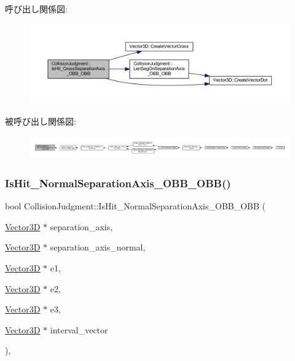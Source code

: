 呼び出し関係図\+:\nopagebreak
\begin{figure}[H]
\begin{center}
\leavevmode
\includegraphics[width=350pt]{class_collision_judgment_a86d5dd5817ff244d22c9efa3eeecbcb7_cgraph}
\end{center}
\end{figure}
被呼び出し関係図\+:
\nopagebreak
\begin{figure}[H]
\begin{center}
\leavevmode
\includegraphics[width=350pt]{class_collision_judgment_a86d5dd5817ff244d22c9efa3eeecbcb7_icgraph}
\end{center}
\end{figure}
\mbox{\label{class_collision_judgment_abb475bce4c67d02d0964355aa60f1362}} 
\subsubsection{\texorpdfstring{Is\+Hit\+\_\+\+Normal\+Separation\+Axis\+\_\+\+O\+B\+B\+\_\+\+O\+B\+B()}{IsHit\_NormalSeparationAxis\_OBB\_OBB()}}
{\footnotesize\ttfamily bool Collision\+Judgment\+::\+Is\+Hit\+\_\+\+Normal\+Separation\+Axis\+\_\+\+O\+B\+B\+\_\+\+O\+BB (\begin{DoxyParamCaption}\item[{\mbox{\hyperlink{class_vector3_d}{Vector3D}} $\ast$}]{separation\+\_\+axis,  }\item[{\mbox{\hyperlink{class_vector3_d}{Vector3D}} $\ast$}]{separation\+\_\+axis\+\_\+normal,  }\item[{\mbox{\hyperlink{class_vector3_d}{Vector3D}} $\ast$}]{e1,  }\item[{\mbox{\hyperlink{class_vector3_d}{Vector3D}} $\ast$}]{e2,  }\item[{\mbox{\hyperlink{class_vector3_d}{Vector3D}} $\ast$}]{e3,  }\item[{\mbox{\hyperlink{class_vector3_d}{Vector3D}} $\ast$}]{interval\+\_\+vector }\end{DoxyParamCaption})\hspace{0.3cm}{\ttfamily [static]}, {\ttfamily [private]}}



